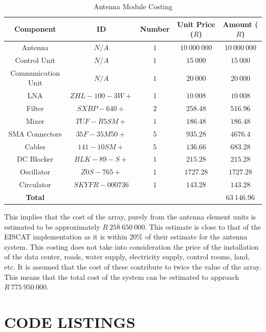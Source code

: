 \documentclass[11pt]{witseiepaper}
\begin{document}
\begin{bibunit}[witseie]
\begin{table}[htb]
    \caption{Antenna Module Costing}
    \label{tab:CostingUnit}
    \begin{center}
        \begin{tabular}{c c c c c}
            \hline 
            Component & ID & Number & Unit Price ($R$) & Amount ($R$) \\
            \hline
            Antenna & $N/A$ & $1$ & $10~000~000$ & $10~000~000$ \\
            Control Unit & $N/A$ & $1$ & $15~000$ & $15~000$ \\
            Communication Unit & $N/A$ & $1$ & $20~000$ & $20~000$ \\

            LNA & $ZHL-100-3W+$ \cite{LNA} & 1 & $10~008$ & $10~008$ \\
            Filter & $SXBP-640+$ \cite{Filter} & $2$ & $258.48$ & $516.96$ \\
            Mixer & $TUF-R5SM+$ \cite{Mixer} & $1$ & $186.48$ & $186.48$ \\
            SMA Connectors & $35F-35M50+$ \cite{SMA} & $5$ & $935.28$ & $4676.4$ \\
            Cables & $141-10SM+$ \cite{Cables} & $5$ & $136.66$ & $683.28$ \\
            DC Blocker & $BLK-89-S+$ \cite{DCBlocker} & $1$ & $215.28$ & $215.28$ \\
            Oscillator & $Z0S-765+$ \cite{Oscillator} & $1$ & $1727.28$ & $1727.28$ \\
            Circulator & $SKYFR-000736$ \cite{Circulator} & $1$ & $143.28$ & $143.28$ \\  
            \hline
            \textbf{Total} & & & & \textbf{$63~146.96$} \\ 
            \hline
        \end{tabular}
    \end{center}
\end{table}
This implies that the cost of the array, purely from the antenna element units is estimated to be approximately $R~258~650~000$. This estimate is close to that of the EISCAT implementation as it is within $20\%$ of their estimate for the antenna system.
This costing does not take into consideration the price of the installation of the data center, roads, water supply, electricity supply, control rooms, land, etc. It is assumed that the cost of these contribute to twice the value of the array.
This means that the total cost of the system can be estimated to approach $R~775~950~000$.





\section{CODE LISTINGS} \label{sec:CodeListings}



\putbib[references]
\end{bibunit}
\end{document}
